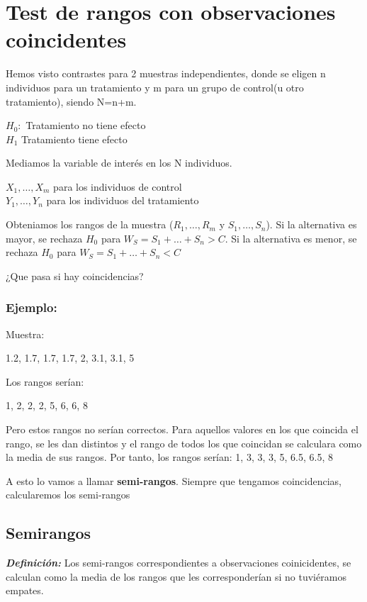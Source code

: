 \section{Test de rangos con observaciones coincidentes}

Hemos visto contrastes para 2 muestras independientes, donde se eligen n individuos para un tratamiento y m para un grupo de control(u otro tratamiento), siendo N=n+m.
\begin{center}
    $H_0: $ Tratamiento no tiene efecto \\
    $H_1$ Tratamiento tiene efecto
\end{center}

Mediamos la variable de interés en los N individuos.
\begin{center}
    $X_1,\dots,X_m$ para los individuos de control \\
    $Y_1,\dots,Y_n$ para los individuos del tratamiento
\end{center}

Obteniamos los rangos de la muestra ($R_1,\dots,R_m$ y $S_1,\dots,S_n$).
Si la alternativa es mayor, se rechaza $H_0$ para $W_S=S_1+\dots+S_n>C$.
Si la alternativa es menor, se rechaza $H_0$ para $W_S=S_1+\dots+S_n<C$

¿Que pasa si hay coincidencias?
\subsubsection*{Ejemplo: }
Muestra:

\begin{center}
    1.2, 1.7, 1.7, 1.7, 2, 3.1, 3.1, 5
\end{center}

Los rangos serían:

\begin{center}
    1, 2, 2, 2, 5, 6, 6, 8
\end{center}

Pero estos rangos no serían correctos. Para aquellos valores en los que coincida el rango, se les dan distintos y el rango de todos los que coincidan se calculara como la media de sus rangos. Por tanto, los rangos serían:
1, 3, 3, 3, 5, 6.5, 6.5, 8

A esto lo vamos a llamar \textbf{semi-rangos}. Siempre que tengamos coincidencias, calcularemos los semi-rangos
\subsection{Semirangos}
\textbf{\textit{Definición: }}Los semi-rangos correspondientes a observaciones coinicidentes, se calculan como la media de los rangos que les corresponderían si no tuviéramos empates.

